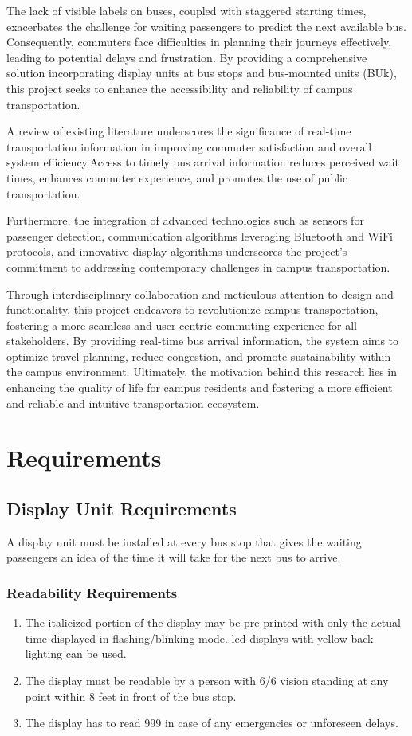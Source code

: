 \documentclass[12pt]{article} %
\begin{document}
The lack of visible labels on buses, coupled with staggered starting times, exacerbates the challenge for waiting passengers to predict the next available bus. Consequently, commuters face difficulties in planning their journeys effectively, leading to potential delays and frustration. By providing a comprehensive solution incorporating display units at bus stops and bus-mounted units (BUk), this project seeks to enhance the accessibility and reliability of campus transportation.

A review of existing literature underscores the significance of real-time transportation information in improving commuter satisfaction and overall system efficiency.Access to timely bus arrival information reduces perceived wait times, enhances commuter experience, and promotes the use of public transportation.

Furthermore, the integration of advanced technologies such as sensors for passenger detection, communication algorithms leveraging Bluetooth and WiFi protocols, and innovative display algorithms underscores the project's commitment to addressing contemporary challenges in campus transportation.

Through interdisciplinary collaboration and meticulous attention to design and functionality, this project endeavors to revolutionize campus transportation, fostering a more seamless and user-centric commuting experience for all stakeholders. By providing real-time bus arrival information, the system aims to optimize travel planning, reduce congestion, and promote sustainability within the campus environment. Ultimately, the motivation behind this research lies in enhancing the quality of life for campus residents and fostering a more efficient and reliable and intuitive transportation ecosystem.

\clearpage

\section{Requirements}
\subsection{Display Unit Requirements}
A display unit must be installed at every bus stop that gives the waiting passengers an idea of the time it will take for the next bus to arrive.
    \subsubsection{Readability Requirements}
    \begin{enumerate}
        \item  The italicized portion of the display may be pre-printed with only the actual time displayed in flashing/blinking mode. \acrshort{lcd} displays with yellow back lighting can be used.
        \item  The display must be readable by a person with 6/6 vision standing at any point within 8 feet in front of the bus stop. 
        \item The display has to read 999 in case of any emergencies or unforeseen delays.
    \end{enumerate}
\end{document}

